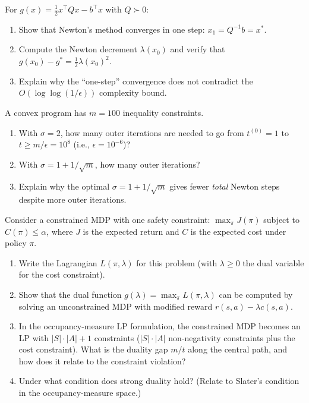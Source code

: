\documentclass[11pt,a4paper]{article}
\begin{document}
\begin{exercise}\label{ex:newton-quad}
For $g(x) = \frac{1}{2}x^\top Q x - b^\top x$ with $Q \succ 0$:
\begin{enumerate}[label=(\alph*)]
  \item Show that Newton's method converges in one step:
    $x_1 = Q^{-1}b = x^*$.
  \item Compute the Newton decrement $\lambda(x_0)$ and verify that
    $g(x_0) - g^* = \frac{1}{2}\lambda(x_0)^2$.
  \item Explain why the ``one-step'' convergence does not contradict
    the $O(\log\log(1/\epsilon))$ complexity bound.
\end{enumerate}
\end{exercise}

\begin{exercise}\label{ex:complexity}
A convex program has $m = 100$ inequality constraints.
\begin{enumerate}[label=(\alph*)]
  \item With $\sigma = 2$, how many outer iterations are needed to go
    from $t^{(0)} = 1$ to $t \ge m/\epsilon = 10^8$ (i.e.,
    $\epsilon = 10^{-6}$)?
  \item With $\sigma = 1 + 1/\sqrt{m}$, how many outer iterations?
  \item Explain why the optimal $\sigma = 1 + 1/\sqrt{m}$ gives fewer
    \emph{total} Newton steps despite more outer iterations.
\end{enumerate}
\end{exercise}

\begin{exercise}\label{ex:cmdp-gap}
Consider a constrained MDP with one safety constraint:
$\max_\pi J(\pi)$ subject to $C(\pi) \le \alpha$, where $J$ is the
expected return and $C$ is the expected cost under policy $\pi$.
\begin{enumerate}[label=(\alph*)]
  \item Write the Lagrangian $L(\pi, \lambda)$ for this problem
    (with $\lambda \ge 0$ the dual variable for the cost constraint).
  \item Show that the dual function
    $g(\lambda) = \max_\pi L(\pi, \lambda)$ can be computed by solving
    an unconstrained MDP with modified reward $r(s,a) - \lambda c(s,a)$.
  \item In the occupancy-measure LP formulation, the constrained MDP
    becomes an LP with $|S| \cdot |A| + 1$ constraints ($|S| \cdot |A|$
    non-negativity constraints plus the cost constraint). What is the
    duality gap $m/t$ along the central path, and how does it relate
    to the constraint violation?
  \item Under what condition does strong duality hold? (Relate to
    Slater's condition in the occupancy-measure space.)
\end{enumerate}
\end{exercise}
\end{document}

